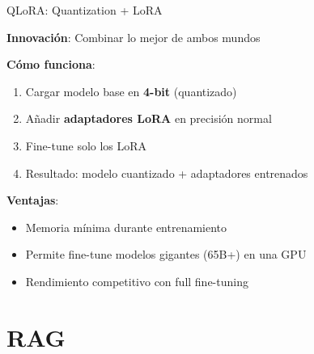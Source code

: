 \begin{frame}{QLoRA: Quantization + LoRA}

\textbf{Innovación}: Combinar lo mejor de ambos mundos

\textbf{Cómo funciona}:
\begin{enumerate}
    \item Cargar modelo base en \textbf{4-bit} (quantizado)
    \item Añadir \textbf{adaptadores LoRA} en precisión normal
    \item Fine-tune solo los LoRA
    \item Resultado: modelo cuantizado + adaptadores entrenados
\end{enumerate}


\textbf{Ventajas}:
\begin{itemize}
    \item Memoria mínima durante entrenamiento
    \item Permite fine-tune modelos gigantes (65B+) en una GPU
    \item Rendimiento competitivo con full fine-tuning
\end{itemize}

\end{frame}


\section{RAG}


